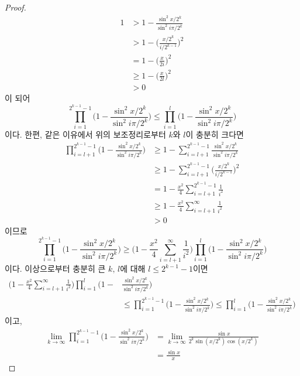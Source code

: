 \begin{proof}
    \begin{align*}
        1&>1-\frac{\sin^2x/2^k}{\sin^2i\pi/2^k}\\
        &>1-\bigg(\frac{x/2^k}{i/2^{k-1}}\bigg)^2\\
        &=1-\bigg(\frac{x}{2i}\bigg)^2\\
        &\geq1-\bigg(\frac{x}{2l}\bigg)^2\\
        &>0
    \end{align*}
    이 되어
    \begin{equation*}
        \prod_{i=1}^{2^{k-1}-1}\bigg(1-\frac{\sin^2x/2^k}{\sin^2i\pi/2^k}\bigg)\leq\prod_{i=1}^l\bigg(1-\frac{\sin^2x/2^k}{\sin^2i\pi/2^k}\bigg)
    \end{equation*}
    이다. 한편, 같은 이유에서 위의 보조정리로부터 $k$와 $l$이 충분히 크다면
    \begin{align*}
        \prod_{i=l+1}^{2^{k-1}-1}\bigg(1-\frac{\sin^2x/2^k}{\sin^2i\pi/2^k}\bigg)&\geq1-\sum_{i=l+1}^{2^{k-1}-1}\frac{\sin^2x/2^k}{\sin^2i\pi/2^k}\\
        &\geq1-\sum_{i=l+1}^{2^{k-1}-1}\bigg(\frac{x/2^k}{i/2^{k-1}}\bigg)^2\\
        &=1-\frac{x^2}{4}\sum_{i=l+1}^{2^{k-1}-1}\frac{1}{i^2}\\
        &\geq1-\frac{x^2}{4}\sum_{i=l+1}^\infty\frac{1}{i^2}\\
        &>0
    \end{align*}
    이므로
    \begin{equation*}
        \prod_{i=1}^{2^{k-1}-1}\bigg(1-\frac{\sin^2x/2^k}{\sin^2i\pi/2^k}\bigg)\geq\bigg(1-\frac{x^2}{4}\sum_{i=l+1}^\infty\frac{1}{i^2}\bigg)\prod_{i=1}^l\bigg(1-\frac{\sin^2x/2^k}{\sin^2i\pi/2^k}\bigg)
    \end{equation*}
    이다. 이상으로부터 충분히 큰 $k,\,l$에 대해 $l\leq2^{k-1}-1$이면 
    \begin{align*}
        \bigg(1-\frac{x^2}{4}\sum_{i=l+1}^\infty\frac{1}{i^2}\bigg)\prod_{i=1}^l\bigg(1-&\frac{\sin^2x/2^k}{\sin^2i\pi/2^k}\bigg)\\
        &\leq\prod_{i=1}^{2^{k-1}-1}\bigg(1-\frac{\sin^2x/2^k}{\sin^2i\pi/2^k}\bigg)\leq\prod_{i=1}^l\bigg(1-\frac{\sin^2x/2^k}{\sin^2i\pi/2^k}\bigg)
    \end{align*}
    이고,
    \begin{align*}
        \lim_{k\to\infty}\prod_{i=1}^{2^{k-1}-1}\bigg(1-\frac{\sin^2x/2^k}{\sin^2i\pi/2^k}\bigg)&=\lim_{k\to\infty}\frac{\sin x}{2^k\sin(x/2^k)\cos(x/2^k)}\\
        &=\frac{\sin x}{x}

\end{align*}
\end{proof}
